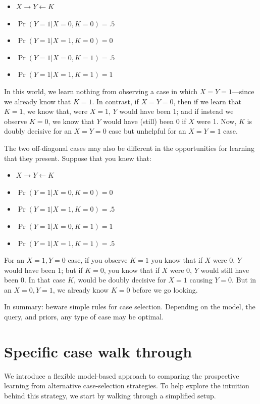 \documentclass[
  12pt,
]{book}
\providecommand{\tightlist}{%
  \setlength{\itemsep}{0pt}\setlength{\parskip}{0pt}}
\begin{document}
\begin{itemize}
\tightlist
\item
  \(X \rightarrow Y \leftarrow K\)
\item
  \(\Pr(Y=1|X=0, K = 0) = .5\)
\item
  \(\Pr(Y=1|X=1, K = 0) = 0\)
\item
  \(\Pr(Y=1|X=0, K = 1) = .5\)
\item
  \(\Pr(Y=1|X=1, K = 1) = 1\)
\end{itemize}

In this world, we learn nothing from observing a case in which \(X=Y=1\)---since we already know that \(K=1\). In contrast, if \(X=Y=0\), then if we learn that \(K=1\), we know that, were \(X=1\), \(Y\) would have been 1; and if instead we observe \(K=0\), we know that \(Y\) would have (still) been 0 if \(X\) were 1. Now, \(K\) is doubly decisive for an \(X=Y=0\) case but unhelpful for an \(X=Y=1\) case.

The two off-diagonal cases may also be different in the opportunities for learning that they present. Suppose that you knew that:

\begin{itemize}
\tightlist
\item
  \(X \rightarrow Y \leftarrow K\)
\item
  \(\Pr(Y=1|X=0, K = 0) = 0\)
\item
  \(\Pr(Y=1|X=1, K = 0) = .5\)
\item
  \(\Pr(Y=1|X=0, K = 1) = 1\)
\item
  \(\Pr(Y=1|X=1, K = 1) = .5\)
\end{itemize}

For an \(X=1, Y=0\) case, if you observe \(K=1\) you know that if \(X\) were 0, \(Y\) would have been 1; but if \(K=0\), you know that if \(X\) were 0, \(Y\) would still have been 0. In that case \(K\), would be doubly decisive for \(X=1\) causing \(Y=0\). But in an \(X=0, Y=1\), we already know \(K=0\) before we go looking.

In summary: beware simple rules for case selection. Depending on the model, the query, and priors, any type of case may be optimal.

\hypertarget{specific-case-walk-through}{%
\section{Specific case walk through}\label{specific-case-walk-through}}

We introduce a flexible model-based approach to comparing the prospective learning from alternative case-selection strategies. To help explore the intuition behind this strategy, we start by walking through a simplified setup.
\end{document}
